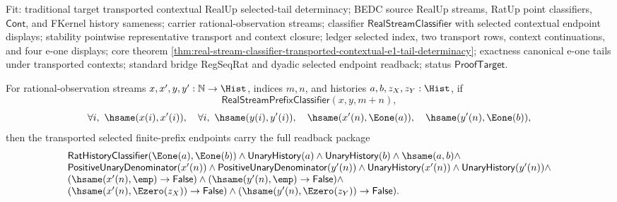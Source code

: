 Fit: traditional target transported contextual RealUp selected-tail
determinacy; BEDC source RealUp streams, RatUp point classifiers,
$\mathsf{Cont}$, and FKernel history sameness; carrier rational-observation
streams; classifier $\mathsf{RealStreamClassifier}$ with selected contextual
endpoint displays; stability pointwise representative transport and context
closure; ledger selected index, two transport rows, context continuations, and
four e-one displays; core theorem
\autoref{thm:real-stream-classifier-transported-contextual-e1-tail-determinacy};
exactness canonical e-one tails under transported contexts; standard bridge
RegSeqRat and dyadic selected endpoint readback; status
$\mathsf{ProofTarget}$.

\begin{theorem}
\label{thm:real-stream-prefix-transported-selected-full-shape-readback-package}
For rational-observation streams $x,x',y,y':\mathbb{N}\to\Hist$, indices
$m,n$, and histories $a,b,z_X,z_Y:\Hist$, if
$$
\mathsf{RealStreamPrefixClassifier}(x,y,m+n),
$$
$$
\forall i,\ \hsame(x(i),x'(i)),\quad
\forall i,\ \hsame(y(i),y'(i)),\quad
\hsame(x'(n),\Eone(a)),\quad
\hsame(y'(n),\Eone(b)),
$$
then the transported selected finite-prefix endpoints carry the full readback
package
$$
\begin{array}{l}
\mathsf{RatHistoryClassifier}(\Eone(a),\Eone(b))\land
\mathsf{UnaryHistory}(a)\land \mathsf{UnaryHistory}(b)\land \hsame(a,b)\land\\
\mathsf{PositiveUnaryDenominator}(x'(n))\land
\mathsf{PositiveUnaryDenominator}(y'(n))\land
\mathsf{UnaryHistory}(x'(n))\land
\mathsf{UnaryHistory}(y'(n))\land\\
(\hsame(x'(n),\emp)\to\mathsf{False})\land
(\hsame(y'(n),\emp)\to\mathsf{False})\land\\
(\hsame(x'(n),\Ezero(z_X))\to\mathsf{False})\land
(\hsame(y'(n),\Ezero(z_Y))\to\mathsf{False}).
\end{array}
$$
\end{theorem}
